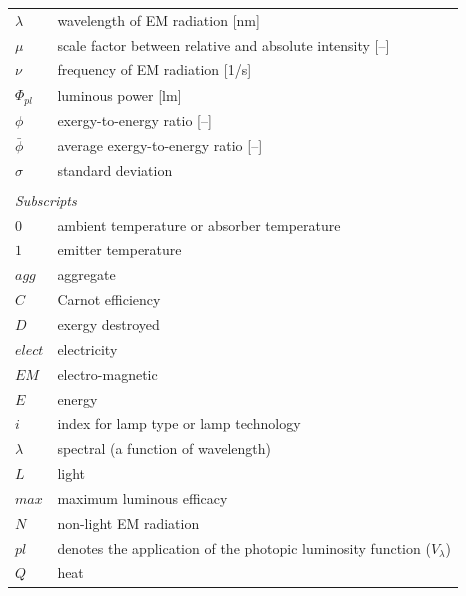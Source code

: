 \documentclass[energies,article,accept,moreauthors,pdftex]{Definitions/mdpi}\usepackage[]{graphicx}\usepackage[]{color}
\begin{document}
\begin{tabular}{ll}
  $\lambda$ & wavelength of EM radiation [nm] \\
  $\mu$ & scale factor between relative and absolute intensity [--] \\
  $\nu$ & frequency of EM radiation [1/s] \\
  $\Phi_{pl}$ & luminous power [lm] \\
  $\phi$ & exergy-to-energy ratio [--] \\
  $\bar{\phi}$ & average exergy-to-energy ratio [--] \\
  $\sigma$ & standard deviation \\
%
\\
\multicolumn{2}{l}{\emph{Subscripts}} \\ 
%
  $0$ & ambient temperature or absorber temperature \\
  $1$ & emitter temperature \\
  $agg$ & aggregate \\
  $C$ & Carnot efficiency \\
  $D$ & exergy destroyed \\
  $elect$ & electricity \\
  $E\!M$ & electro-magnetic \\
  $E$ & energy \\
  $i$ & index for lamp type or lamp technology \\
  $\lambda$ & spectral (a function of wavelength) \\
  $L$ & light \\
  $max$ & maximum luminous efficacy \\

  $N$ & non-light EM radiation \\
  $pl$ & denotes the application of the photopic luminosity function ($V_{\lambda}$) \\
  $Q$ & heat \\
\end{tabular}
\end{document}
